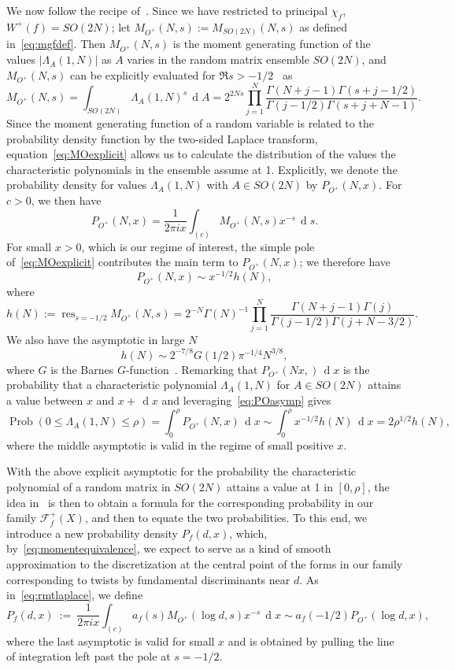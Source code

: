 \documentclass[11pt,reqno]{amsart} \usepackage{fullpage}
\renewcommand{\leq}{\leqslant}
\renewcommand{\d}[1]{\,\operatorname*{d}\!{#1}}
\newcommand\be{\begin{equation}}
\newcommand\ee{\end{equation}}
\DeclareMathOperator{\res}{res}
\DeclareMathOperator{\Prob}{Prob}
\numberwithin{equation}{section}
\begin{document}
We now follow the recipe of~\cite[\S5]{DHKMS}. Since we have restricted to principal
$\chi_f$, $W^+(f)=SO(2N)$; let $M_{O^+}(N,s):=M_{SO(2N)}(N,s)$ as defined
in~\eqref{eq:mgfdef}. Then $M_{O^+}(N,s)$ is the moment generating function of the values
$\left|\Lambda_A(1,N)\right|$ as $A$ varies in the random matrix ensemble $SO(2N)$, and
$M_{O^+}(N,s)$ can be explicitly evaluated for $\Re s>-1/2$~\cite{rmtL} as
\be\label{eq:MOexplicit} M_{O^+}(N,s)=\int_{SO(2N)}\Lambda_A(1,N)^s\d A
=2^{2Ns}\prod_{j=1}^N\frac{\Gamma(N+j-1)\Gamma(s+j-1/2)}{\Gamma(j-1/2)\Gamma(s+j+N-1)}.\ee
Since the moment generating function of a random variable is related to the probability
density function by the two-sided Laplace transform, equation~\eqref{eq:MOexplicit} allows
us to calculate the distribution of the values the characteristic polynomials in the
ensemble assume at 1. Explicitly, we denote the probability density for values
$\Lambda_A(1,N)$ with $A\in SO(2N)$ by $P_{O^+}(N,x)$. For $c>0$, we then have
\be\label{eq:rmtlaplace} P_{O^+}(N,x)=\frac1{2\pi ix}\int_{(c)}M_{O^+}(N,s)x^{-s}\d s.\ee
For small $x>0$, which is our regime of interest, the simple pole of~\eqref{eq:MOexplicit}
contributes the main term to $P_{O^+}(N,x)$; we therefore have
\be\label{eq:POasymp} P_{O^+}(N,x)\sim x^{-1/2}h(N),\ee where
\be h(N):=\res_{s={-1/2}}M_{O^+}(N,s)=2^{-N}\Gamma(N)^{-1}\prod_{j=1}^N
\frac{\Gamma(N+j-1)\Gamma(j)}{\Gamma(j-1/2)\Gamma(j+N-3/2)}.\ee
We also have the asymptotic in large $N$
\be\label{eq:hNasymp} h(N)\sim2^{-7/8}G(1/2)\pi^{-1/4}N^{3/8},\ee
where $G$ is the Barnes $G$-function~\cite{barnes}.
Remarking that $P_{O^+}(Nx,)\d x$ is the probability that a characteristic polynomial
$\Lambda_A(1,N)$ for $A\in SO(2N)$ attains a value between $x$ and $x+\d x$ and
leveraging~\eqref{eq:POasymp} gives
\be\label{eq:probasymp}\Prob\left(0\leq\Lambda_A(1,N)\leq\rho\right)
=\int_0^\rho P_{O^+}(N,x)\d x\sim\int_0^\rho x^{-1/2}h(N)\d x=2\rho^{1/2}h(N),\ee where the
middle asymptotic is valid in the regime of small positive $x$.

With the above explicit asymptotic for the probability the characteristic polynomial of
a random matrix in $SO(2N)$ attains a value at 1 in $[0,\rho]$, the idea in~\cite{DHKMS} is
then to obtain a formula for the corresponding probability in our family $\mathcal F^+_f(X)$,
and then to equate the two probabilities. To this end, we introduce a new probability
density $P_f(d,x)$, which, by~\eqref{eq:momentequivalence}, we expect to serve as a kind of
smooth approximation to the discretization at the central point of the forms in our family
corresponding to twists by fundamental discriminants near $d$. As in~\eqref{eq:rmtlaplace},
we define\be\label{eq:Pfdef}
P_f(d,x)\ :=\ \frac1{2\pi ix}\int_{(c)}a_f(s) M_{O^+}(\log d,s)x^{-s}\d x
\sim a_f(-1/2)P_{O^+}(\log d,x),\ee where the last asymptotic is valid for small
$x$ and is obtained by pulling the line of integration left past the pole at $s=-1/2$.
\end{document}
